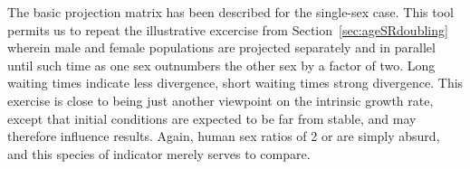  \FloatBarrier
The basic projection matrix has been described for the single-sex case. This
tool permits us to repeat the illustrative excercise from
Section~\ref{sec:ageSRdoubling} wherein male and female populations are
projected separately and in parallel until such time as one sex outnumbers the
other sex by a factor of two. Long waiting times indicate less divergence, short
waiting times strong divergence. This exercise is close to being just another
viewpoint on the intrinsic growth rate, except that initial conditions are
expected to be far from stable, and may therefore influence results. Again,
human sex ratios of 2 or \textonehalf are simply absurd, and this species of
indicator merely serves to compare.

